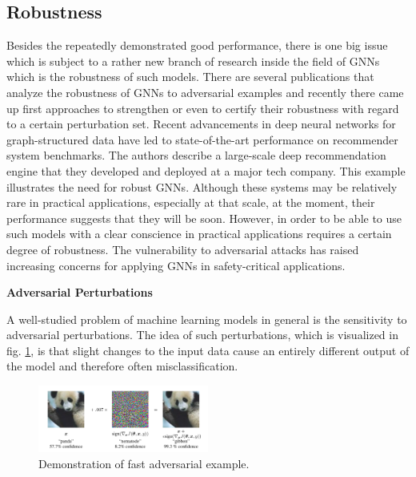 \documentclass[a4paper,preprint]{sig-alternate}
\begin{document}
\subsection{Robustness}

Besides the repeatedly demonstrated good performance, there is one big issue which is subject to a rather new branch of 
research inside the field of GNNs which is the robustness of such models. There are several publications that analyze 
the robustness of GNNs to adversarial examples and recently there came up first approaches to strengthen
or even to certify their robustness with regard to a certain perturbation set.\newline
Recent advancements in deep neural networks for graph-structured data have led to state-of-the-art performance on recommender system benchmarks.\cite{Ying_2018}
The authors describe a large-scale deep recommendation engine that they developed and deployed at a major tech company.
This example illustrates the need for robust GNNs. Although these systems may be relatively rare in practical applications, especially at
that scale, at the moment, their performance suggests that they will be soon. However, in order to be able to use such models
with a clear conscience in practical applications requires a certain degree of robustness.
The vulnerability to adversarial attacks has raised increasing concerns for applying GNNs in safety-critical applications.\cite{jin2020graph}\newline

\textbf{Adversarial Perturbations}\newline

A well-studied problem of machine learning models in general is the sensitivity to adversarial perturbations.\cite{goodfellow2015explaining}
The idea of such perturbations, which is visualized in fig. \ref{fig:adversarial_example}, is that slight changes to the input data
cause an entirely different output of the model and therefore often misclassification.

\begin{figure}[h]
    \centering
    \includegraphics[width=0.5\textwidth]{img/adversarial_example.png}
    \caption{Demonstration of fast adversarial example. \cite{goodfellow2015explaining}}
    \label{fig:adversarial_example}
\end{figure}
\end{document}
